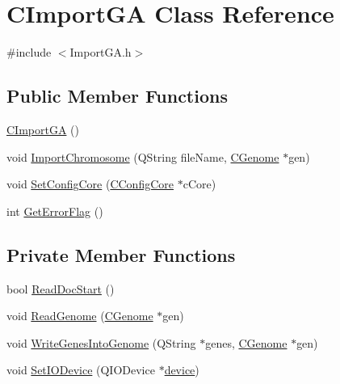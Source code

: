 \hypertarget{classCImportGA}{
\section{CImportGA Class Reference}
\label{classCImportGA}
}


{\ttfamily \#include $<$ImportGA.h$>$}\subsection*{Public Member Functions}
\begin{DoxyCompactItemize}
\item 
\hyperlink{classCImportGA_ae697ea4a3cee45b973e6331422dde4c0}{CImportGA} ()
\item 
void \hyperlink{classCImportGA_a384bf039491b76cac0d07225e479ce26}{ImportChromosome} (QString fileName, \hyperlink{classCGenome}{CGenome} $\ast$gen)
\item 
void \hyperlink{classCImportGA_a30c6e30805279b7e795895d64a05852d}{SetConfigCore} (\hyperlink{classCConfigCore}{CConfigCore} $\ast$cCore)
\item 
int \hyperlink{classCImportGA_aee42b056447a05412413fdad4f2d233b}{GetErrorFlag} ()
\end{DoxyCompactItemize}
\subsection*{Private Member Functions}
\begin{DoxyCompactItemize}
\item 
bool \hyperlink{classCImportGA_add157c36e5436ea5e433a5aa1eeca605}{ReadDocStart} ()
\item 
void \hyperlink{classCImportGA_a31342a1ba9bdae4a94575bf5733d1b45}{ReadGenome} (\hyperlink{classCGenome}{CGenome} $\ast$gen)
\item 
void \hyperlink{classCImportGA_a034ce47fefb46cc7e87f225909b2ab92}{WriteGenesIntoGenome} (QString $\ast$genes, \hyperlink{classCGenome}{CGenome} $\ast$gen)
\item 
void \hyperlink{classCImportGA_a1e777dd84da02e20b2dccb8e90423082}{SetIODevice} (QIODevice $\ast$\hyperlink{classCImportGA_a8b3d05f98d84a34529eaa25423606e3c}{device})
\end{DoxyCompactItemize}
